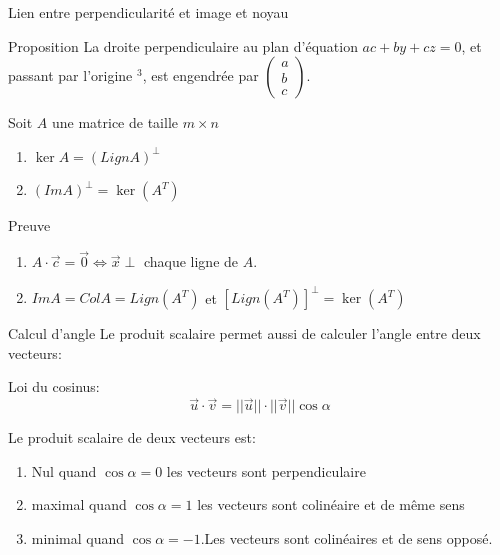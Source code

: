 \begin{parag}{Lien entre perpendicularité et image et noyau}
    \begin{subparag}{Proposition}
        La droite perpendiculaire au plan d’équation $ac + by + cz = 0$, et passant par l'origine \R$^3$, est engendrée par $\begin{pmatrix}
            a \\b \\ c
        \end{pmatrix}$.
    \end{subparag}
    \begin{theoreme}
        Soit $A$ une matrice de taille $m \times n$
        \begin{enumerate}
            \item $\ker A = (LignA)^\perp$
            \item $(ImA)^\perp = \ker(A^T)$
        \end{enumerate}
    \end{theoreme}
    \begin{subparag}{Preuve}
        \begin{enumerate}
            \item $A\cdot\vec{c} = \vec{0} \Leftrightarrow \vec{x}\perp$ chaque ligne de $A$.
            \item  $ImA = ColA = Lign(A^T)$ et $[Lign(A^T)]^\perp = \ker(A^T)$
        \end{enumerate}
    \end{subparag}

\end{parag}

\begin{parag}{Calcul d'angle}
 Le produit scalaire permet aussi de calculer l'angle entre deux vecteurs:
 \begin{theoreme}
     Loi du cosinus:
     \[\vec{u}\cdot \vec{v} = ||\vec{u}||\cdot ||\vec{v}||\cos \alpha\]
 \end{theoreme}
 Le produit scalaire de deux vecteurs est:
 \begin{enumerate}
     \item Nul quand $\cos\alpha = 0$ les vecteurs sont perpendiculaire
     \item maximal quand $\cos \alpha = 1$ les vecteurs sont colinéaire et de même sens
     \item minimal quand $\cos\alpha = -1$.Les vecteurs sont colinéaires et de sens opposé.
 \end{enumerate}
\end{parag}

